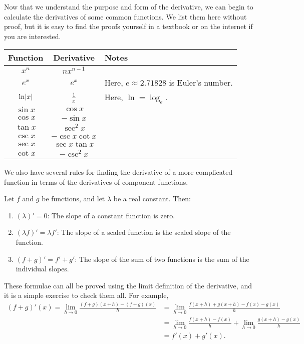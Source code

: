 


Now that we understand the purpose and form of the derivative, we can begin to calculate
the derivatives of some common functions. We list them here without proof, but it is easy
to find the proofs yourself in a textbook or on the internet if you are interested.

\begin{center}
  \def\arraystretch{1.5}
  \begin{tabular}{|c|c|l|}\hline
    \textbf{Function} & \textbf{Derivative} & \textbf{Notes}\\\hline
    $ x^n $ & $ nx^{n - 1} $&\\\hline
    $ e^x $ & $ e^x $ & Here, $ e \approx 2.71828 $ is Euler's number. \\\hline
    $ \ln \abs{x} $ & $ \frac{1}{x} $ & Here, $ \ln = \log_e $. \\\hline
    $ \sin x $ & $ \cos x $&\\\hline
    $ \cos x $ & $ -\sin x $&\\\hline
    $ \tan x $ & $ \sec^2 x $&\\\hline
    $ \csc x $ & $ -\csc x \cot x $&\\\hline
    $ \sec x $ & $ \sec x \tan x $&\\\hline
    $ \cot x $ & $ -\csc^2 x $&\\\hline
  \end{tabular}
\end{center}

We also have several rules for finding the derivative of a more complicated function in terms of the derivatives of component
functions.

\begin{thm}
  Let $ f $ and $ g $ be functions, and let $ \lambda $ be a real constant. Then:
  \begin{enumerate}
    \item $ (\lambda)' = 0 $: The slope of a constant function is zero.
    \item $ (\lambda f)' = \lambda f' $: The slope of a scaled function is the scaled slope of the function.
    \item $ (f + g)' = f' + g' $: The slope of the sum of two functions is the sum of the individual slopes.
  \end{enumerate}
\end{thm}

These formulae can all be proved using the limit definition of the derivative, and it is a simple exercise to check them all. For example,
\begin{align*}
  (f + g)'(x) = \lim_{h \to 0} \frac{(f + g)(x + h) - (f + g)(x)}{h} &= \lim_{h \to 0} \frac{f(x + h) + g(x + h) - f(x) - g(x)}{h} \\
                                                                     &= \lim_{h \to 0} \frac{f(x + h) - f(x)}{h} + \lim_{h \to 0} \frac{g(x + h) - g(x)}{h} \\
                                                                     &= f'(x) + g'(x).
\end{align*}

